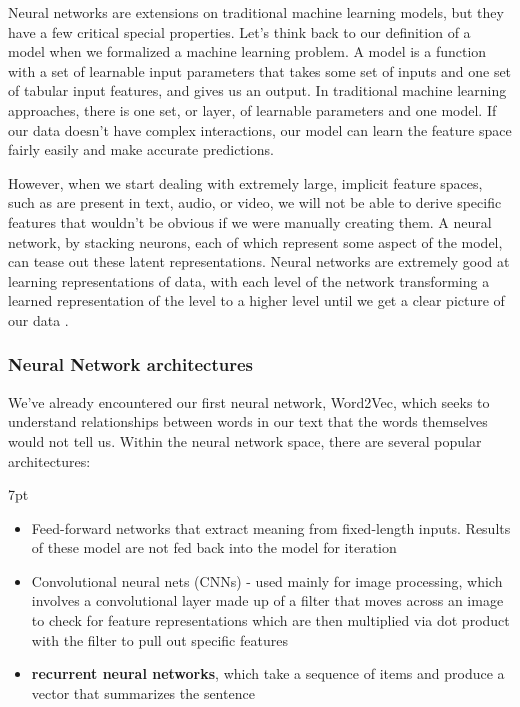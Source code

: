 \documentclass[11pt, table]{diazessay} %
\newenvironment{formal}{%
  \def\FrameCommand{%
	\hspace{1pt}%
	{\color{w_lightblue}\vrule width 2pt}%
	{\color{formalshade}\vrule width 4pt}%
	\colorbox{formalshade}%
  }%
  \MakeFramed{\advance\hsize-\width\FrameRestore}%
  \noindent\hspace{-4.55pt}%
  \begin{adjustwidth}{}{7pt}%
  \vspace{2pt}\vspace{2pt}%
}
{%
  \vspace{2pt}\end{adjustwidth}\endMakeFramed%
}
\begin{document}
\begin{sloppypar}
Neural networks are extensions on traditional machine learning models, but they have a few critical special properties. Let's think back to our definition of a model when we formalized a machine learning problem. A model is a function with a set of learnable input parameters that takes some set of inputs and one set of tabular input features, and gives us an output. In traditional machine learning approaches, there is one set, or layer, of learnable parameters and  one model. If our data doesn't have complex interactions, our model can learn the feature space fairly easily and make accurate predictions.

However, when we start dealing with extremely large, implicit feature spaces, such as are present in text, audio, or video, we will not be able to derive specific features that wouldn't be obvious if we were manually creating them. A neural network, by stacking neurons, each of which represent some aspect of the model, can tease out these latent representations. Neural networks are extremely good at learning representations of data, with each level of the network transforming a learned representation of the level to a higher level until we get a clear picture of our data \citep{lecun2015deep}.

\subsubsection{Neural Network architectures}

We've already encountered our first neural network, Word2Vec, which seeks to understand relationships between words in our text that the words themselves would not tell us. Within the neural network space, there are several popular architectures:

\begin{formal}
\begin{itemize}
  \item Feed-forward networks that extract meaning from fixed-length inputs. Results of these model are not fed back into the model for iteration
  \item Convolutional neural nets (CNNs) - used mainly for image processing, which involves a convolutional layer made up of a filter that moves across an image to check for feature representations which are then multiplied via dot product with the filter to pull out specific features
  \item \textbf{recurrent neural networks}, which take a sequence of items and produce a vector that summarizes the sentence
\end{itemize}
\end{formal}


\end{sloppypar}
\end{document}
